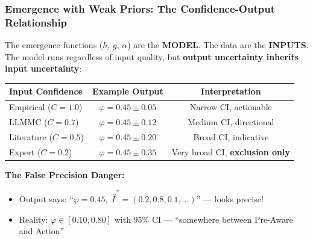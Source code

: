 \subsubsection{Emergence with Weak Priors: The Confidence-Output Relationship}
\label{sec:hhh-weak-priors}

\begin{tcolorbox}[colback=red!5!white, colframe=red!75!black,
    title=\textbf{Critical Question: What Happens When We Emerge from Expert Estimates Only?}]

The emergence functions ($h$, $g$, $\alpha$) are the \textbf{MODEL}. The data are the \textbf{INPUTS}. The model runs regardless of input quality, but \textbf{output uncertainty inherits input uncertainty}:

\begin{center}
\renewcommand{\arraystretch}{1.3}
\begin{tabular}{@{}lcc@{}}
\toprule
\textbf{Input Confidence} & \textbf{Example Output} & \textbf{Interpretation} \\
\midrule
Empirical ($C = 1.0$) & $\varphi = 0.45 \pm 0.05$ & Narrow CI, actionable \\
LLMMC ($C = 0.7$) & $\varphi = 0.45 \pm 0.12$ & Medium CI, directional \\
Literature ($C = 0.5$) & $\varphi = 0.45 \pm 0.20$ & Broad CI, indicative \\
Expert ($C = 0.2$) & $\varphi = 0.45 \pm 0.35$ & Very broad CI, \textbf{exclusion only} \\
\bottomrule
\end{tabular}
\end{center}

\textbf{The False Precision Danger:}
\begin{itemize}[nosep]
    \item Output says: ``$\varphi = 0.45$, $\vec{I}^* = (0.2, 0.8, 0.1, \ldots)$'' --- looks precise!
    \item Reality: $\varphi \in [0.10, 0.80]$ with 95\% CI --- ``somewhere between Pre-Aware and Action''
\end{itemize}
\end{tcolorbox}

